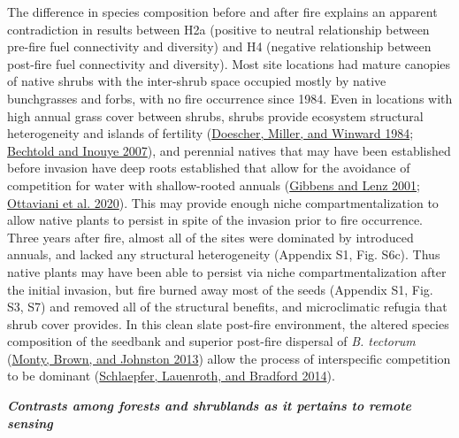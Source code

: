 \documentclass[
  12pt,
]{article}
\begin{document}
The difference in species composition before and after fire explains an
apparent contradiction in results between H2a (positive to neutral
relationship between pre-fire fuel connectivity and diversity) and H4
(negative relationship between post-fire fuel connectivity and
diversity). Most site locations had mature canopies of native shrubs
with the inter-shrub space occupied mostly by native bunchgrasses and
forbs, with no fire occurrence since 1984. Even in locations with high
annual grass cover between shrubs, shrubs provide ecosystem structural
heterogeneity and islands of fertility
(\protect\hyperlink{ref-Doescher1984}{Doescher, Miller, and Winward
1984}; \protect\hyperlink{ref-Bechtold2007}{Bechtold and Inouye 2007}),
and perennial natives that may have been established before invasion
have deep roots established that allow for the avoidance of competition
for water with shallow-rooted annuals
(\protect\hyperlink{ref-Gibbens2001}{Gibbens and Lenz 2001};
\protect\hyperlink{ref-Ottaviani2020}{Ottaviani et al. 2020}). This may
provide enough niche compartmentalization to allow native plants to
persist in spite of the invasion prior to fire occurrence. Three years
after fire, almost all of the sites were dominated by introduced
annuals, and lacked any structural heterogeneity (Appendix S1, Fig.
S6c). Thus native plants may have been able to persist via niche
compartmentalization after the initial invasion, but fire burned away
most of the seeds (Appendix S1, Fig. S3, S7) and removed all of the
structural benefits, and microclimatic refugia that shrub cover
provides. In this clean slate post-fire environment, the altered species
composition of the seedbank and superior post-fire dispersal of \emph{B.
tectorum} (\protect\hyperlink{ref-Monty2013}{Monty, Brown, and Johnston
2013}) allow the process of interspecific competition to be dominant
(\protect\hyperlink{ref-Schlaepfer2014}{Schlaepfer, Lauenroth, and
Bradford 2014}).

\textbf{\emph{Contrasts among forests and shrublands as it pertains to
remote sensing}}
\end{document}

